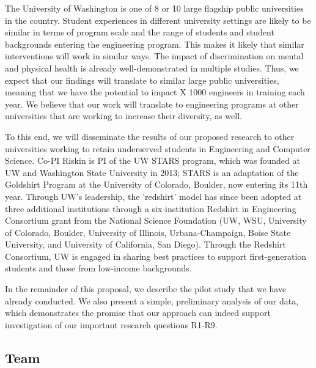 The University of Washington is one of 8 or 10 large flagship public universities in the country.  Student experiences in different university settings are likely to be similar in terms of program scale and the range of students and student backgrounds entering the engineering program. This makes it likely that similar interventions will work in similar ways. The impact of discrimination on mental and physical health is already well-demonstrated in multiple studies. Thus, we expect that our findings will translate to similar large public universities, meaning that we have the potential to impact X 1000 engineers in training each year. We believe that our work will translate to engineering programs at other universities that are working to increase their diversity, as well. 

To this end, we will disseminate the results of our proposed research to other universities working to retain underserved students in Engineering and Computer Science.  Co-PI Riskin is PI of the UW STARS program, which was founded at UW and Washington State University in 2013;  STARS is an adaptation of the Goldshirt Program at the University of Colorado, Boulder, now entering its 11th year. Through UW’s leadership, the 'redshirt' model has since been adopted at three additional institutions through a six-institution Redshirt in Engineering Consortium grant from the National Science Foundation (UW, WSU, University of Colorado, Boulder, University of Illinois, Urbana-Champaign, Boise State University, and University of California, San Diego). Through the Redshirt Consortium, UW is engaged in sharing best practices to support first-generation students and those from low-income backgrounds. 

In the remainder of this proposal, we describe the pilot study that we have already conducted. We also present a simple, preliminary analysis of our data, which demonstrates the promise that our approach can indeed support investigation of our important research questions R1-R9.
 
\subsection{Team}
 
